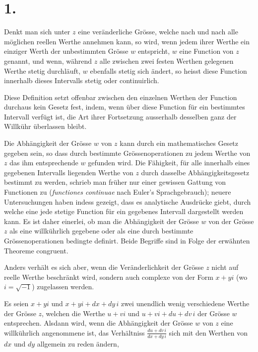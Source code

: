 \documentclass{article}
\begin{document}
\section*{1.}

Denkt man sich unter $z$ eine veränderliche Grösse, welche nach und nach alle möglichen reellen Werthe annehmen kann, so wird, wenn jedem ihrer Werthe ein einziger Werth der unbestimmten Grösse $w$ entspricht, $w$ eine Function von $z$ genannt, und wenn, während $z$ alle zwischen zwei festen Werthen gelegenen Werthe stetig durchläuft, $w$ ebenfalls stetig sich ändert, so heisst diese Function innerhalb dieses Intervalls stetig oder continuirlich.

Diese Definition setzt offenbar zwischen den einzelnen Werthen der Function durchaus kein Gesetz fest, indem, wenn über diese Function für ein bestimmtes Intervall verfügt ist, die Art ihrer Fortsetzung ausserhalb desselben ganz der Willkühr überlassen bleibt.

Die Abhängigkeit der Grösse $w$ von $z$ kann durch ein mathematisches Gesetz gegeben sein, so dass durch bestimmte Grössenoperationen zu jedem Werthe von $z$ das ihm entsprechende $w$ gefunden wird. Die Fähigkeit, für alle innerhalb eines gegebenen Intervalls liegenden Werthe von $z$ durch dasselbe Abhängigkeitsgesetz bestimmt zu werden, schrieb man früher nur einer gewissen Gattung von Functionen zu (\emph{functiones continuae} nach Euler's Sprachgebrauch); neuere Untersuchungen haben indess gezeigt, dass es analytische Ausdrücke giebt, durch welche eine jede stetige Function für ein gegebenes Intervall dargestellt werden kann. Es ist daher einerlei, ob man die Abhängigkeit der Grösse $w$ von der Grösse $z$ als eine willkührlich gegebene oder als eine durch bestimmte Grössenoperationen bedingte definirt. Beide Begriffe sind in Folge der erwähnten Theoreme congruent.

Anders verhält es sich aber, wenn die Veränderlichkeit der Grösse $z$ nicht auf reelle Werthe beschränkt wird, sondern auch complexe von der Form $x + yi$ (wo $i = \sqrt{-1}$) zugelassen werden.

Es seien $x + yi$ und $x + yi + dx + dy\,i$ zwei unendlich wenig verschiedene Werthe der Grösse $z$, welchen die Werthe $u + vi$ und $u + vi + du + dv\,i$ der Grösse $w$ entsprechen. Alsdann wird, wenn die Abhängigkeit der Grösse $w$ von $z$ eine willkührlich angenommene ist, das Verhältniss $\frac{du + dv\,i}{dx + dy\,i}$ sich mit den Werthen von $dx$ und $dy$ allgemein zu reden ändern,
\end{document}
